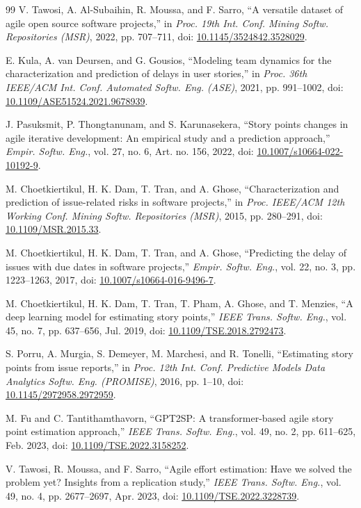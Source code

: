 \documentclass[journal]{IEEEtran}
\begin{document}
\begin{thebibliography}{99}
 V. Tawosi, A. Al-Subaihin, R. Moussa, and F. Sarro, ``A versatile dataset of agile open source software projects,'' in \emph{Proc. 19th Int. Conf. Mining Softw. Repositories (MSR)}, 2022, pp. 707--711, doi: \url{10.1145/3524842.3528029}.

 E. Kula, A. van Deursen, and G. Gousios, ``Modeling team dynamics for the characterization and prediction of delays in user stories,'' in \emph{Proc. 36th IEEE/ACM Int. Conf. Automated Softw. Eng. (ASE)}, 2021, pp. 991--1002, doi: \url{10.1109/ASE51524.2021.9678939}.

 J. Pasuksmit, P. Thongtanunam, and S. Karunasekera, ``Story points changes in agile iterative development: An empirical study and a prediction approach,'' \emph{Empir. Softw. Eng.}, vol. 27, no. 6, Art. no. 156, 2022, doi: \url{10.1007/s10664-022-10192-9}.

 M. Choetkiertikul, H. K. Dam, T. Tran, and A. Ghose, ``Characterization and prediction of issue-related risks in software projects,'' in \emph{Proc. IEEE/ACM 12th Working Conf. Mining Softw. Repositories (MSR)}, 2015, pp. 280--291, doi: \url{10.1109/MSR.2015.33}.

 M. Choetkiertikul, H. K. Dam, T. Tran, and A. Ghose, ``Predicting the delay of issues with due dates in software projects,'' \emph{Empir. Softw. Eng.}, vol. 22, no. 3, pp. 1223--1263, 2017, doi: \url{10.1007/s10664-016-9496-7}.

 M. Choetkiertikul, H. K. Dam, T. Tran, T. Pham, A. Ghose, and T. Menzies, ``A deep learning model for estimating story points,'' \emph{IEEE Trans. Softw. Eng.}, vol. 45, no. 7, pp. 637--656, Jul. 2019, doi: \url{10.1109/TSE.2018.2792473}.

 S. Porru, A. Murgia, S. Demeyer, M. Marchesi, and R. Tonelli, ``Estimating story points from issue reports,'' in \emph{Proc. 12th Int. Conf. Predictive Models Data Analytics Softw. Eng. (PROMISE)}, 2016, pp. 1--10, doi: \url{10.1145/2972958.2972959}.

 M. Fu and C. Tantithamthavorn, ``GPT2SP: A transformer-based agile story point estimation approach,'' \emph{IEEE Trans. Softw. Eng.}, vol. 49, no. 2, pp. 611--625, Feb. 2023, doi: \url{10.1109/TSE.2022.3158252}.

 V. Tawosi, R. Moussa, and F. Sarro, ``Agile effort estimation: Have we solved the problem yet? Insights from a replication study,'' \emph{IEEE Trans. Softw. Eng.}, vol. 49, no. 4, pp. 2677--2697, Apr. 2023, doi: \url{10.1109/TSE.2022.3228739}.


\end{thebibliography}
\end{document}
